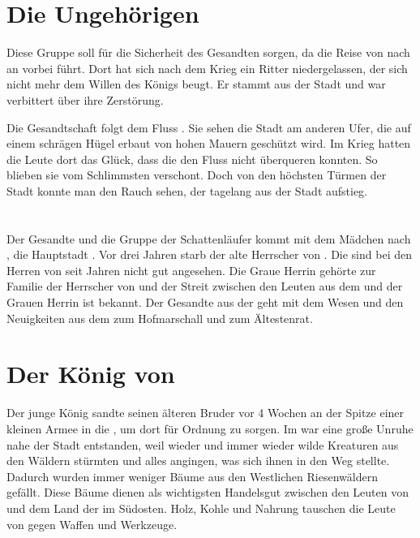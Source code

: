 \begin{huge}
\section{Die Ungehörigen}

Diese Gruppe soll für die Sicherheit des Gesandten sorgen, da die Reise von \Mundis nach \Rhin an \Golrin vorbei führt. Dort hat sich nach dem Krieg ein Ritter niedergelassen, der sich nicht mehr dem Willen des Königs beugt. Er stammt aus der Stadt und war verbittert über ihre Zerstörung.

Die Gesandtschaft folgt dem Fluss \Rhin . Sie sehen die Stadt \Helin am anderen Ufer, die auf einem schrägen Hügel erbaut von hohen Mauern geschützt wird. Im Krieg hatten die Leute dort das Glück, dass die \Eislaufer den Fluss nicht überqueren konnten. So blieben sie vom Schlimmsten verschont. Doch von den höchsten Türmen der Stadt konnte man den Rauch sehen, der tagelang aus der Stadt \Golrin aufstieg.

\section{\Rhin}

Der Gesandte und die Gruppe der Schattenläufer kommt mit dem Mädchen nach \Rhin, die Hauptstadt . Vor drei Jahren starb der alte Herrscher von \Rhingell. Die \Schattenjager sind bei den Herren von \Rhingell seit Jahren nicht gut angesehen. Die Graue Herrin gehörte zur Familie der Herrscher von \Rhingell und der Streit zwischen den Leuten aus dem \Enland und der Grauen Herrin ist bekannt. Der Gesandte \Arn aus der \Bergmark geht mit dem Wesen und den Neuigkeiten aus dem \Enland zum Hofmarschall und zum Ältestenrat.

\section{Der König von \Rhingell}
Der junge König sandte seinen älteren Bruder vor 4 Wochen an der Spitze einer kleinen Armee in die , um dort für Ordnung zu sorgen. Im \Grunland war eine große Unruhe nahe der Stadt \Braucheln entstanden, weil wieder und immer wieder wilde Kreaturen aus den Wäldern stürmten und alles angingen, was sich ihnen in den Weg stellte. Dadurch wurden immer weniger Bäume aus den Westlichen Riesenwäldern gefällt. Diese Bäume dienen als wichtigsten Handelsgut zwischen den Leuten von \Rhingell und dem Land der \Eisenmeister im Südosten. Holz, Kohle und Nahrung tauschen die Leute von \Rhingell gegen Waffen und Werkzeuge.


\end{huge}
